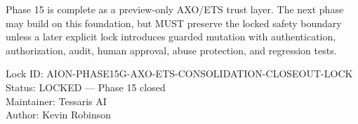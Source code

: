 Phase 15 is complete as a preview-only AXO/ETS trust layer. The next phase may build on this foundation, but MUST preserve the locked safety boundary unless a later explicit lock introduces guarded mutation with authentication, authorization, audit, human approval, abuse protection, and regression tests.

\bigskip

\noindent Lock ID: AION-PHASE15G-AXO-ETS-CONSOLIDATION-CLOSEOUT-LOCK\\
Status: LOCKED --- Phase 15 closed\\
Maintainer: Tessaris AI\\
Author: Kevin Robinson
